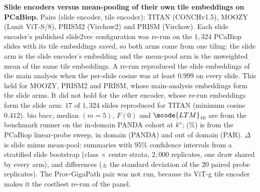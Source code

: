 \begin{table}[!htbp]
\caption{\textbf{Slide encoders versus mean-pooling of their own tile embeddings on PCaBiop.} Pairs (slide encoder, tile encoder): TITAN (CONCHv1.5), MOOZY (Lunit ViT-S/8), PRISM2 (Virchow2) and PRISM (Virchow). Each slide encoder's published slide2vec configuration was re-run on the $1{,}324$ PCaBiop slides with its tile embeddings saved, so both arms come from one tiling: the slide arm is the slide encoder's embedding and the mean-pool arm is the unweighted mean of the same tile embeddings. A re-run reproduced the slide embeddings of the main analysis when the per-slide cosine was at least $0.999$ on every slide. This held for MOOZY, PRISM2 and PRISM, whose main-analysis embeddings form the slide arms. It did not hold for the other encoder, whose re-run embeddings form the slide arm: $17$ of $1{,}324$ slides reproduced for TITAN (minimum cosine $0.412$). bio bacc, median $(m{=}5)$, $F(0)$ and $\mcode{LTM}_{10}$ are from the benchmark runner on the in-domain PANDA cohort at $k^\star$;  (\%) is from the PCaBiop linear-probe sweep, in domain (PANDA) and out of domain (PAR). $\Delta$ is slide minus mean-pool:  summaries with 95\% confidence intervals from a stratified slide bootstrap (class $\times$ centre strata, $2{,}000$ replicates, one draw shared by every arm), and  differences ($\pm$ the standard deviation of the $20$ paired probe replicates). The Prov-GigaPath pair was not run, because its ViT-g tile encoder makes it the costliest re-run of the panel.}
\label{tab:slide-vs-meanpool}
\end{table}
